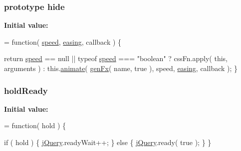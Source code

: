 \subsubsection[{hide}]{ {\bf prototype} hide}\label{jquery-1_810_82-vsdoc_8js_ab184a969b4c8542290dae744d90fd4d2}
{\bfseries Initial value\+:}
\begin{DoxyCode}
= \textcolor{keyword}{function}( \hyperlink{jquery-1_810_82-vsdoc_8js_add98c90065e6563cba26ff6d2016c46c}{speed}, \hyperlink{jquery-1_810_82-vsdoc_8js_a9758a312629fa6de1744280dd6e6253b}{easing}, callback ) \{


        \textcolor{keywordflow}{return} \hyperlink{jquery-1_810_82-vsdoc_8js_add98c90065e6563cba26ff6d2016c46c}{speed} == null || typeof \hyperlink{jquery-1_810_82-vsdoc_8js_add98c90065e6563cba26ff6d2016c46c}{speed} === \textcolor{stringliteral}{"boolean"} ?
            cssFn.apply( \textcolor{keyword}{this}, arguments ) :
            this.\hyperlink{jquery-1_810_82-vsdoc_8js_a956a1d08128d41115c45b6815814a64d}{animate}( \hyperlink{_bibabook_2_scripts_2jquery-1_810_82_8js_a0dad9ae6c57fd32a071de202faa87081}{genFx}( name, \textcolor{keyword}{true} ), speed, \hyperlink{jquery-1_810_82-vsdoc_8js_a9758a312629fa6de1744280dd6e6253b}{easing}, callback );
    \}
\end{DoxyCode}
\hypertarget{jquery-1_810_82-vsdoc_8js_a551f58116e29e1744dd3bea8e611eb9f}{}
\subsubsection[{hold\+Ready}]{ hold\+Ready}\label{jquery-1_810_82-vsdoc_8js_a551f58116e29e1744dd3bea8e611eb9f}
{\bfseries Initial value\+:}
\begin{DoxyCode}
= \textcolor{keyword}{function}( hold ) \{


        \textcolor{keywordflow}{if} ( hold ) \{
            \hyperlink{jquery-1_810_82-vsdoc_8js_add5237586d970a38a81f990e8eb28c6c}{jQuery}.readyWait++;
        \} \textcolor{keywordflow}{else} \{
            \hyperlink{jquery-1_810_82-vsdoc_8js_add5237586d970a38a81f990e8eb28c6c}{jQuery}.ready( \textcolor{keyword}{true} );
        \}
    \}
\end{DoxyCode}
\hypertarget{jquery-1_810_82-vsdoc_8js_a89022f117a4ab5bd5f578a26a7eaafa5}{}
